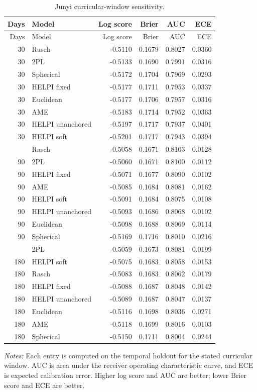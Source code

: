 \documentclass[
  12pt]{article}
\newcommand{\TableNote}[1]{%
  \par\vspace{0.35em}\noindent
  \begin{minipage}{0.96\linewidth}
    \footnotesize\setstretch{1.05}\raggedright
    \textit{Notes:} #1
  \end{minipage}%
  \par\vspace{0.6\baselineskip}%
}
\theoremstyle{definition}
\theoremstyle{plain}
\begin{document}
\begin{longtable}{rlrrrr}
	\caption{Junyi curricular-window sensitivity.}\label{tab:junyi-windows}\\
	\toprule
	Days & Model & Log score & Brier & AUC & ECE \\
	\midrule
	\endfirsthead
	\toprule
	Days & Model & Log score & Brier & AUC & ECE \\
	\midrule
	\endhead
	30 & Rasch & -0.5110 & 0.1679 & 0.8027 & 0.0360 \\
	30 & 2PL & -0.5133 & 0.1690 & 0.7991 & 0.0316 \\
	30 & Spherical & -0.5172 & 0.1704 & 0.7969 & 0.0293 \\
	30 & HELPI fixed & -0.5177 & 0.1711 & 0.7953 & 0.0337 \\
	30 & Euclidean & -0.5177 & 0.1706 & 0.7957 & 0.0316 \\
	30 & AME & -0.5183 & 0.1714 & 0.7952 & 0.0363 \\
	30 & HELPI unanchored & -0.5197 & 0.1717 & 0.7937 & 0.0401 \\
	30 & HELPI soft & -0.5201 & 0.1717 & 0.7943 & 0.0394 \\
	\addlinespace
	90 & Rasch & -0.5058 & 0.1671 & 0.8103 & 0.0128 \\
	90 & 2PL & -0.5060 & 0.1671 & 0.8100 & 0.0112 \\
	90 & HELPI fixed & -0.5071 & 0.1677 & 0.8090 & 0.0102 \\
	90 & AME & -0.5085 & 0.1684 & 0.8081 & 0.0162 \\
	90 & HELPI soft & -0.5091 & 0.1684 & 0.8075 & 0.0108 \\
	90 & HELPI unanchored & -0.5093 & 0.1686 & 0.8068 & 0.0102 \\
	90 & Euclidean & -0.5098 & 0.1688 & 0.8069 & 0.0114 \\
	90 & Spherical & -0.5169 & 0.1716 & 0.8010 & 0.0216 \\
	\addlinespace
	180 & 2PL & -0.5059 & 0.1673 & 0.8081 & 0.0199 \\
	180 & HELPI soft & -0.5075 & 0.1683 & 0.8058 & 0.0153 \\
	180 & Rasch & -0.5083 & 0.1683 & 0.8062 & 0.0179 \\
	180 & HELPI fixed & -0.5088 & 0.1687 & 0.8048 & 0.0142 \\
	180 & HELPI unanchored & -0.5089 & 0.1687 & 0.8047 & 0.0137 \\
	180 & Euclidean & -0.5116 & 0.1698 & 0.8036 & 0.0271 \\
	180 & AME & -0.5118 & 0.1699 & 0.8016 & 0.0103 \\
	180 & Spherical & -0.5150 & 0.1711 & 0.8004 & 0.0244 \\
	\bottomrule
\end{longtable}
\TableNote{Each entry is computed on the temporal holdout for the stated curricular window. AUC is area under the receiver operating characteristic curve, and ECE is expected calibration error. Higher log score and AUC are better; lower Brier score and ECE are better.}
\end{document}
